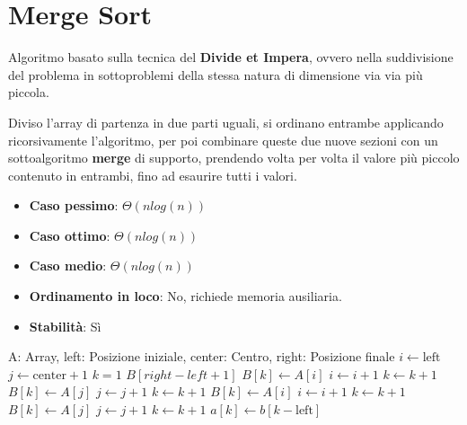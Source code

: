 %

\section{Merge Sort}
Algoritmo basato sulla tecnica del \textbf{Divide et Impera}, ovvero nella suddivisione del problema in sottoproblemi della stessa natura di dimensione via via più piccola.\par
Diviso l'array di partenza in due parti uguali, si ordinano entrambe applicando ricorsivamente l'algoritmo, per poi combinare queste due nuove sezioni con un sottoalgoritmo \textbf{merge} di supporto, prendendo volta per volta il valore più piccolo contenuto in entrambi, fino ad esaurire tutti i valori. \begin{itemize}
	\item \textbf{Caso pessimo}: $\Theta(nlog(n))$
	\item \textbf{Caso ottimo}: $\Theta(nlog(n))$
	\item \textbf{Caso medio}: $\Theta(nlog(n))$
	\item \textbf{Ordinamento in loco}: No, richiede memoria ausiliaria.
	\item \textbf{Stabilità}: Sì
\end{itemize}
\begin{algorithm}[H]
	\caption{merge(A, left, center, right)}
	\begin{algorithmic}[1]
		\Require A: Array, left: Posizione iniziale, center: Centro, right: Posizione finale
		\State $i\gets \text{left}$
		\State $j\gets \text{center}+1$
		\State $k = 1$ 
		\State $B[right-left+1]$ 
		\State
		 
		 
		\State $B[k]\gets A[i]$
		\State $i\gets i+1$
		\State $k\gets k+1$
		\Else {}
		\State $B[k]\gets A[j]$
		\State $j\gets j+1$
		\State $k\gets k+1$ 
		\EndIf
		\EndWhile
		 
		\State $B[k]\gets A[i]$
		\State $i\gets i+1$
		\State $k\gets k+1$
		\EndWhile
		 
		\State $B[k]\gets A[j]$
		\State $j\gets j+1$
		\State $k\gets k+1$
		\EndWhile
		 
		\State $a[k]\gets b[k-\text{left}]$
		\EndFor
	\end{algorithmic}
\end{algorithm}
